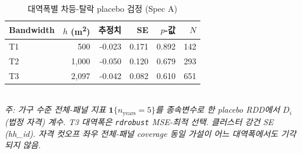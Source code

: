 \begin{table}[ht]
\centering
\caption{대역폭별 차등-탈락 placebo 검정 (Spec A)}
\label{tab:attrition-placebo-full-ko}
\small
\begin{tabular}{lrrrrr}
\toprule
Bandwidth & $h$ (m\textsuperscript{2}) & 추정치 & SE & $p$-값 & $N$ \\
\midrule
T1 & 500 & -0.023 & 0.171 & 0.892 & 142 \\
T2 & 1,000 & -0.050 & 0.120 & 0.679 & 293 \\
T3 & 2,097 & -0.042 & 0.082 & 0.610 & 651 \\
\bottomrule
\end{tabular}
\\
\footnotesize\textit{주: 가구 수준 전체-패널 지표 $\mathbf{1}\{n_{\text{years}}=5\}$를 종속변수로 한 placebo RDD에서 $D_i$ (법정 자격) 계수. T3 대역폭은 \texttt{rdrobust} MSE-최적 선택. 클러스터 강건 SE (hh\_id). 자격 컷오프 좌우 전체-패널 coverage 동일 가설이 어느 대역폭에서도 기각되지 않음.}
\end{table}

